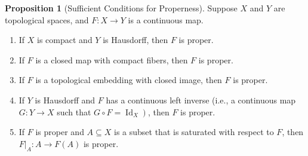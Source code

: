 \documentclass[12pt,a4paper]{book}
\newenvironment{prooff}{{\noindent\it\textcolor{cyan!40!black}{Proof}:}\,}{\par}
\newenvironment{enu}{\begin{enumerate}[(1)]}{\end{enumerate}}
\theoremstyle{definition}
\newtheorem{theo}[defn]{Theorem}
\newtheorem{prop}[defn]{Proposition}
\begin{document}
\begin{prop}[Sufficient Conditions for Properness]
    Suppose $X$ and $Y$ are topological spaces, and $F: X \rightarrow Y$ is a continuous map.
    \begin{enu}
        \item If $X$ is compact and $Y$ is Hausdorff, then $F$ is proper.
        \item If $F$ is a closed map with compact fibers, then $F$ is proper.
        \item If $F$ is a topological embedding with closed image, then $F$ is proper.
        \item If $Y$ is Hausdorff and $F$ has a continuous left inverse (i.e., a continuous map $G: Y \rightarrow X$ such that $\left.G \circ F=\operatorname{Id}_X\right)$, then $F$ is proper.
        \item If $F$ is proper and $A \subseteq X$ is a subset that is saturated with respect to $F$, then $\left.F\right|_A: A \rightarrow F(A)$ is proper.
    \end{enu}
\end{prop}

\end{document}

